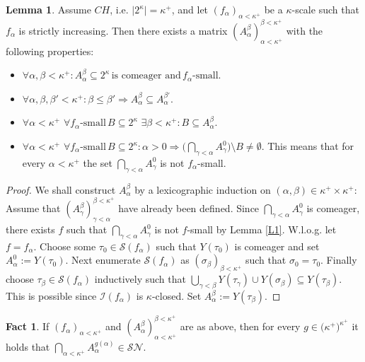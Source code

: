 \documentclass[12pt,a4paper]{scrartcl}
\theoremstyle{definition}
\newtheorem{fact}[definition]{Fact}
\newtheorem{lemma}[definition]{Lemma}
\numberwithin{equation}{section}
\begin{document}
\begin{lemma} \label{L2}
Assume $CH$, i.e. $\vert 2^\kappa \vert = \kappa^+$, and let $(f_\alpha)_{\alpha < \kappa^+}$ be a $\kappa$-scale such that $f_\alpha$ is strictly increasing. Then there exists a matrix $(A_\alpha ^\beta)_{\alpha <\kappa^+} ^{\beta < \kappa^+}$ with the following properties:
\begin{itemize}
\item $\forall \alpha, \beta <\kappa^+ \colon A_\alpha^\beta \subseteq 2^\kappa \, \text{is comeager and}  \, f_\alpha\text{-small}$.
\item $\forall \alpha, \beta, \beta' <\kappa^+ \colon \beta \leq \beta' \Rightarrow A_\alpha^\beta \subseteq A_\alpha^{\beta'}$.
\item $\forall \alpha < \kappa^+ \,\, \forall f_\alpha \text{-small} \, B \subseteq 2^\kappa \,\, \exists \beta <\kappa^+ \colon B \subseteq A_\alpha^\beta$.
\item $\forall \alpha < \kappa^+ \,\, \forall f_\alpha \text{-small} \, B \subseteq 2^\kappa \colon \alpha > 0 \Rightarrow \big ( \bigcap_{\gamma< \alpha} A_\gamma^0 \big ) \setminus B \neq \emptyset$. This means that for every $\alpha < \kappa^+$ the set $\bigcap_{\gamma< \alpha} A_\gamma^0$ is not $f_\alpha$-small.
\end{itemize}
\end{lemma}

\begin{proof}
We shall construct $A_\alpha^\beta$ by a lexicographic induction on $(\alpha, \beta)\in \kappa^+ \times \kappa^+$: Assume that $(A_\gamma^\beta)_{\gamma < \alpha}^{\beta < \kappa^+}$ have already been defined. Since $\bigcap_{\gamma< \alpha} A_\gamma^0$ is comeager, there exists $f$ such that $\bigcap_{\gamma< \alpha} A_\gamma^0$ is not $f$-small by Lemma \ref{L1}.  W.l.o.g. let $f=f_\alpha$. Choose some $\tau_0 \in \mathcal{S}(f_\alpha)$ such that $Y(\tau_0)$ is comeager and set $A_\alpha^0:= Y(\tau_0)$. Next enumerate $\mathcal{S}(f_\alpha)$ as $(\sigma_\beta)_{\beta < \kappa^+}$ such that $\sigma_0 =\tau_0$. Finally choose $\tau_\beta \in \mathcal{S}(f_\alpha)$ inductively such that $\bigcup_{\gamma < \beta} Y(\tau_\gamma) \cup Y(\sigma_\beta) \subseteq Y(\tau_\beta)$. This is possible since $\mathcal{I}(f_\alpha)$ is $\kappa$-closed. Set $A_\alpha^\beta:=Y(\tau_\beta)$.
\end{proof}

\begin{fact}
If $(f_\alpha)_{\alpha < \kappa^+}$ and $(A_\alpha ^\beta)_{\alpha <\kappa^+} ^{\beta < \kappa^+}$ are as above, then for every $g \in \big (\kappa^+ \big )^{\kappa^+}$ it holds that $\bigcap_{\alpha < \kappa^+} A_\alpha^{g(\alpha)} \in \mathcal{SN}$.
\end{fact}
\end{document}
